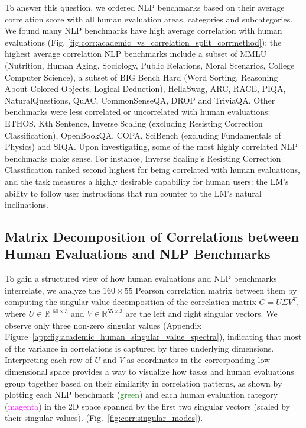 To answer this question, we ordered NLP benchmarks based on their average correlation score with all human evaluation areas, categories and subcategories.
We found many NLP benchmarks have high average correlation with human evaluations (Fig. \ref{fig:corr:academic_vs_correlation_split_corrmethod}); the highest average correlation NLP benchmarks include a subset of MMLU (Nutrition, Human Aging, Sociology, Public Relations, Moral Scenarios, College Computer Science), a subset of BIG Bench Hard (Word Sorting, Reasoning About Colored Objects, Logical Deduction), HellaSwag, ARC, RACE, PIQA, NaturalQuestions, QuAC, CommonSenseQA, DROP and TriviaQA. Other benchmarks were less correlated or uncorrelated with human evaluations: ETHOS, Kth Sentence, Inverse Scaling (excluding Resisting Correction Classification), OpenBookQA, COPA, SciBench (excluding Fundamentals of Physics) and SIQA.
Upon investigating, some of the most highly correlated NLP benchmarks make sense. For instance, Inverse Scaling's Resisting Correction Classification ranked second highest for being correlated with human evaluations, and the task measures a highly desirable capability for human users: the LM's ability to follow user instructions that run counter to the LM's natural inclinations.


\subsection{Matrix Decomposition of Correlations between Human Evaluations and NLP Benchmarks} \label{sec:correlations:subsec:community_detection}


To gain a structured view of how human evaluations and NLP benchmarks interrelate, we analyze the $160 \times 55$ Pearson correlation matrix between them by computing the singular value decomposition of the correlation matrix $C = U \Sigma V^T$, where $U \in \mathbb{R}^{160 \times 3}$ and $V \in \mathbb{R}^{55 \times 3}$ are the left and right singular vectors. 
We observe only three non-zero singular values (Appendix Figure~\ref{app:fig:academic_human_singular_value_spectra}), indicating that most of the variance in correlations is captured by three underlying dimensions.
Interpreting each row of $U$ and $V$ as coordinates in the corresponding low-dimensional space provides a way to visualize how tasks and human evaluations group together based on their similarity in correlation patterns, as shown by plotting each NLP benchmark (\textcolor{Green}{green}) and each human evaluation category (\textcolor{Magenta}{magenta}) in the 2D space spanned by the first two singular vectors (scaled by their singular values). (Fig.~\ref{fig:corr:singular_modes}).



